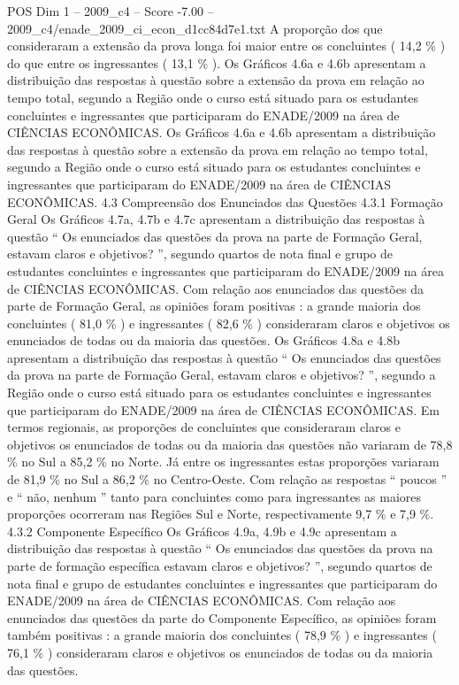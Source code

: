 \begin{textsample}{POS Dim 1 – 2009\_c4 – Score -7.00 – 2009\_c4/enade\_2009\_ci\_econ\_d1cc84d7e1.txt}
A proporção dos que consideraram a extensão da prova longa foi maior entre os concluintes ( 14,2 \% ) do que entre os ingressantes ( 13,1 \% ).
Os Gráficos 4.6a e 4.6b apresentam a distribuição das respostas à questão sobre a extensão da prova em relação ao tempo total, segundo a Região onde o curso está situado para os estudantes concluintes e ingressantes que participaram do ENADE/2009 na área de CIÊNCIAS ECONÔMICAS.
Os Gráficos 4.6a e 4.6b apresentam a distribuição das respostas à questão sobre a extensão da prova em relação ao tempo total, segundo a Região onde o curso está situado para os estudantes concluintes e ingressantes que participaram do ENADE/2009 na área de CIÊNCIAS ECONÔMICAS. 4.3 Compreensão dos Enunciados das Questões 4.3.1 Formação Geral Os Gráficos 4.7a, 4.7b e 4.7c apresentam a distribuição das respostas à questão “ Os enunciados das questões da prova na parte de Formação Geral, estavam claros e objetivos? ”, segundo quartos de nota final e grupo de estudantes concluintes e ingressantes que participaram do ENADE/2009 na área de CIÊNCIAS ECONÔMICAS.
Com relação aos enunciados das questões da parte de Formação Geral, as opiniões foram positivas : a grande maioria dos concluintes ( 81,0 \% ) e ingressantes ( 82,6 \% ) consideraram claros e objetivos os enunciados de todas ou da maioria das questões.
Os Gráficos 4.8a e 4.8b apresentam a distribuição das respostas à questão “ Os enunciados das questões da prova na parte de Formação Geral, estavam claros e objetivos? ”, segundo a Região onde o curso está situado para os estudantes concluintes e ingressantes que participaram do ENADE/2009 na área de CIÊNCIAS ECONÔMICAS.
Em termos regionais, as proporções de concluintes que consideraram claros e objetivos os enunciados de todas ou da maioria das questões não variaram de 78,8 \% no Sul a 85,2 \% no Norte.
Já entre os ingressantes estas proporções variaram de 81,9 \% no Sul a 86,2 \% no Centro-Oeste.
Com relação as respostas “ poucos ” e “ não, nenhum ” tanto para concluintes como para ingressantes as maiores proporções ocorreram nas Regiões Sul e Norte, respectivamente 9,7 \% e 7,9 \%. 4.3.2 Componente Específico Os Gráficos 4.9a, 4.9b e 4.9c apresentam a distribuição das respostas à questão “ Os enunciados das questões da prova na parte de formação específica estavam claros e objetivos? ”, segundo quartos de nota final e grupo de estudantes concluintes e ingressantes que participaram do ENADE/2009 na área de CIÊNCIAS ECONÔMICAS.
Com relação aos enunciados das questões da parte do Componente Específico, as opiniões foram também positivas : a grande maioria dos concluintes ( 78,9 \% ) e ingressantes ( 76,1 \% ) consideraram claros e objetivos os enunciados de todas ou da maioria das questões.

\end{textsample}
